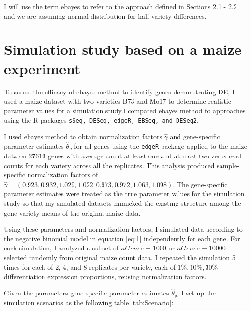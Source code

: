 \documentclass[11pt]{isuthesis}
\begin{document}
I will use the term ebayes to refer to the approach defined in Sections 2.1 - 2.2 and we are assuming normal distribution for half-variety differences.


\section{Simulation study based on a maize experiment}

To assess the efficacy of ebayes method to identify genes demonstrating DE, I used a maize dataset with two varieties B73 and Mo17\citep{paschold2012complementation} to determine realistic parameter values for a simulation study.I compared ebayes method to approaches using the R packages {\tt sSeq, DESeq, edgeR, EBSeq, and DESeq2}.

I used ebayes method to obtain normalization factors $\hat{\gamma}$ and gene-specific parameter estimates $\hat{\theta}_g$ for all genes using the {\tt edgeR} package\citep{robinson2010edger} applied to the maize data\citep{paschold2012complementation} on $27619$ genes with average count at least one and at most two zeros read counts for each variety across all the replicates. This analysis produced sample-specific normalization factors of $\hat{\gamma} = (0.923, 0.932, 1.029, 1.022, 0.973, 0.972, 1.063, 1.098)$. The gene-specific parameter estimates were treated as the true parameter values for the simulation study so that my simulated datasets mimicked the existing structure among the gene-variety means of the original maize data.

Using these parameters and normalization factors, I simulated data according to the negative binomial model in equation \ref{eq:1} independently for each gene. For each simulation, I analyzed a subset of $nGenes=1000$ or $nGenes=10000$ selected randomly from original maize count data. I repeated the simulation 5 times for each of 2, 4, and 8 replicates per variety, each of $1\%, 10\%, 30\%$ differentiation expression proportions, reusing normalization factors. 

Given the parameters gene-specific parameter estimates $\hat{\theta}_g$, I set up the simulation scenarios as the following table \ref{tab:Scenario}:
\end{document}
